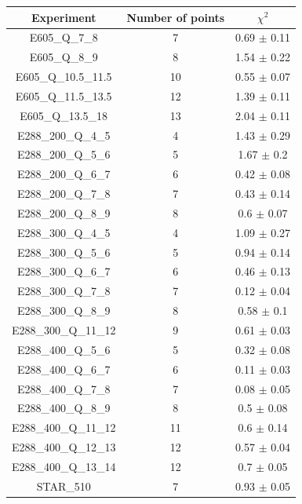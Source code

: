 \documentclass[
]{article}
\begin{document}
\begin{table}[h]

\centering

\begin{tabular}{|c|c|c|} \hline

\textbf{Experiment} & \textbf{Number of
points} & \textbf{\(\chi^2\)} \\ \hline

E605\_Q\_7\_8 & 7 & 0.69 \(\pm\) 0.11 \\ \hline
E605\_Q\_8\_9 & 8 & 1.54 \(\pm\) 0.22 \\ \hline
E605\_Q\_10.5\_11.5 & 10 & 0.55 \(\pm\) 0.07 \\ \hline
E605\_Q\_11.5\_13.5 & 12 & 1.39 \(\pm\) 0.11 \\ \hline
E605\_Q\_13.5\_18 & 13 & 2.04 \(\pm\) 0.11 \\ \hline
E288\_200\_Q\_4\_5 & 4 & 1.43 \(\pm\) 0.29 \\ \hline
E288\_200\_Q\_5\_6 & 5 & 1.67 \(\pm\) 0.2 \\ \hline
E288\_200\_Q\_6\_7 & 6 & 0.42 \(\pm\) 0.08 \\ \hline
E288\_200\_Q\_7\_8 & 7 & 0.43 \(\pm\) 0.14 \\ \hline
E288\_200\_Q\_8\_9 & 8 & 0.6 \(\pm\) 0.07 \\ \hline
E288\_300\_Q\_4\_5 & 4 & 1.09 \(\pm\) 0.27 \\ \hline
E288\_300\_Q\_5\_6 & 5 & 0.94 \(\pm\) 0.14 \\ \hline
E288\_300\_Q\_6\_7 & 6 & 0.46 \(\pm\) 0.13 \\ \hline
E288\_300\_Q\_7\_8 & 7 & 0.12 \(\pm\) 0.04 \\ \hline
E288\_300\_Q\_8\_9 & 8 & 0.58 \(\pm\) 0.1 \\ \hline
E288\_300\_Q\_11\_12 & 9 & 0.61 \(\pm\) 0.03 \\ \hline
E288\_400\_Q\_5\_6 & 5 & 0.32 \(\pm\) 0.08 \\ \hline
E288\_400\_Q\_6\_7 & 6 & 0.11 \(\pm\) 0.03 \\ \hline
E288\_400\_Q\_7\_8 & 7 & 0.08 \(\pm\) 0.05 \\ \hline
E288\_400\_Q\_8\_9 & 8 & 0.5 \(\pm\) 0.08 \\ \hline
E288\_400\_Q\_11\_12 & 11 & 0.6 \(\pm\) 0.14 \\ \hline
E288\_400\_Q\_12\_13 & 12 & 0.57 \(\pm\) 0.04 \\ \hline
E288\_400\_Q\_13\_14 & 12 & 0.7 \(\pm\) 0.05 \\ \hline
STAR\_510 & 7 & 0.93 \(\pm\) 0.05 \\ \hline

\end{tabular}
\end{table}
\end{document}
